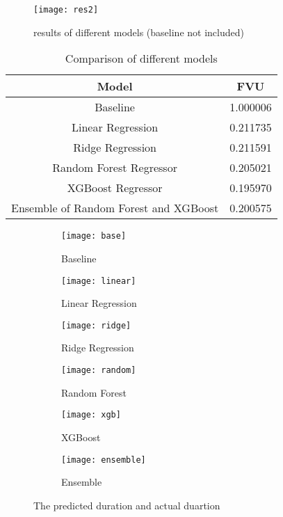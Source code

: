   \begin{figure}[h!]
  \centering
  \texttt{[image: res2]}
  \caption{results of different models (baseline not included)}
  \label{fig_r2}
  \end{figure}

	\begin{center}
	\begin{table}[h!]
	\caption{Comparison of different models}
	\label{tab_2}
	\begin{tabular}{ |c|c| } 
	 \hline
	 Model & FVU\\ 
	 \hline
	 Baseline & 1.000006 \\ 
	 \hline
	 Linear Regression & 0.211735\\ 
	 \hline
	 Ridge Regression & 0.211591\\
	 \hline
	 Random Forest Regressor & 0.205021\\
	 \hline
	 XGBoost Regressor & 0.195970\\
	 \hline
	 Ensemble of Random Forest and XGBoost & 0.200575\\
	 \hline
	\end{tabular}
	\end{table}
	\end{center}

\begin{figure}[ht] 
  \begin{subfigure}[b]{0.5\linewidth}
    \centering
    \texttt{[image: base]} 
    \caption{Baseline} 
    \vspace{4ex}
  \end{subfigure}%
  \begin{subfigure}[b]{0.5\linewidth}
    \centering
    \texttt{[image: linear]} 
    \caption{Linear Regression} 
    \vspace{4ex}
  \end{subfigure} 
  \begin{subfigure}[b]{0.5\linewidth}
    \centering
    \texttt{[image: ridge]} 
    \caption{Ridge Regression} 
    \vspace{4ex}
  \end{subfigure}%
  \begin{subfigure}[b]{0.5\linewidth}
    \centering
    \texttt{[image: random]} 
    \caption{Random Forest} 
    \vspace{4ex}
  \end{subfigure} 
  \begin{subfigure}[b]{0.5\linewidth}
    \centering
    \texttt{[image: xgb]} 
    \caption{XGBoost} 
    \vspace{4ex}
  \end{subfigure}%
  \begin{subfigure}[b]{0.5\linewidth}
    \centering
    \texttt{[image: ensemble]} 
    \caption{Ensemble} 
    \vspace{4ex}
  \end{subfigure} 
  \caption{The predicted duration and actual duartion}
  \label{fig-all}
 \end{figure}

